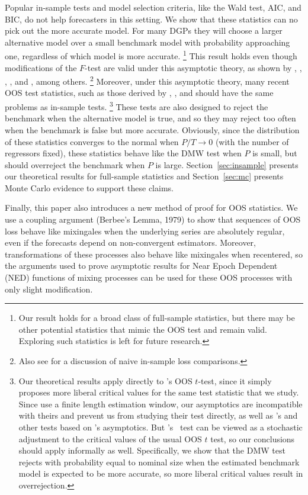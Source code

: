 \documentclass[11pt]{article}
\newcommand{\citepos}[1]{\citeauthor{#1}'s \citeyearpar{#1}}
\newcommand{\clws}{\citeauthor{ClW:06}'s \citeyearpar{ClW:06,ClW:07}}
\begin{document}
Popular in-sample tests and model selection criteria, like the Wald
test, AIC, and BIC, do not help forecasters in this setting. We show
that these statistics can no pick out the more accurate model. For
many DGPs they will choose a larger alternative model over a small
benchmark model with probability approaching one, regardless of which
model is more accurate.%
\footnote{Our result holds for a broad class of
  full-sample statistics, but there may be other potential statistics
  that mimic the OOS test and remain valid. Exploring such
  statistics is left for future research.} %
This result holds even though modifications of the $F$-test are valid
under this asymptotic theory, as shown by \citet{BoB:95},
\citet{AkA:00}, \citet{AkP:04}, \citet{Cal:11c}, and \citet{Ana:12},
among others.%
\footnote{Also see \citet{Efr:86,Efr:04} for a discussion
  of naive in-sample loss comparisons.} %
Moreover, under this asymptotic theory, many recent OOS test
statistics, such as those derived by \cite{ClM:01,ClM:05},
\citet{Mcc:07}, and \citet{ClW:06,ClW:07} should have the same
problems as in-sample tests.%
\footnote{Our theoretical results apply
  directly to \citepos{Mcc:07} OOS $t$-test, since it simply
  proposes more liberal critical values for the same test statistic
  that we study.  Since \citet{ClW:06,ClW:07} use a finite length
  estimation window, our asymptotics are incompatible with theirs and
  prevent us from studying their test directly, as well as
  \citepos{GiW:06} and other tests based on \citepos{GiW:06}
  asymptotics.  But \clws\ test can be viewed as a stochastic
  adjustment to the critical values of the usual OOS $t$ test, so
  our conclusions should apply informally as well.  Specifically, we
  show that the DMW test rejects with probability equal to nominal
  size when the estimated benchmark model is expected to be more
  accurate, so more liberal critical values result in overrejection.} %
These tests are also designed to reject the benchmark when the
alternative model is true, and so they may reject too often when the
benchmark is false but more accurate.  Obviously, since the
distribution of these statistics converges to the normal when $P/T \to
0$ (with the number of regressors fixed), these statistics behave like
the DMW test when $P$ is small, but should overreject the benchmark
when $P$ is large. Section~\ref{sec:insample} presents our theoretical
results for full-sample statistics and Section~\ref{sec:mc} presents
Monte Carlo evidence to support these claims.

Finally, this paper also introduces a new method of proof for OOS
statistics.  We use a coupling argument (Berbee's Lemma, 1979) to show
that sequences of OOS loss behave like mixingales when the
underlying series are absolutely regular, even if the forecasts depend
on non-convergent estimators.  Moreover, transformations of these
processes also behave like mixingales when recentered, so 
the arguments used to prove asymptotic
results for Near Epoch Dependent (NED) functions of mixing processes
can be used for these OOS processes with only slight modification.
\end{document}
